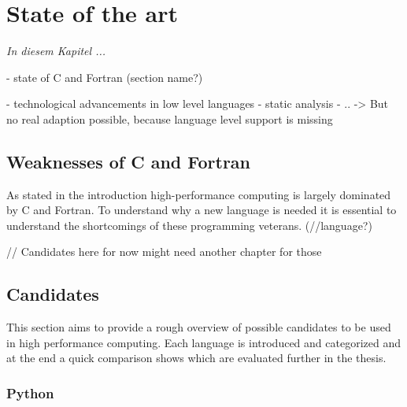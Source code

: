 \chapter{State of the art}
\label{chap:State_of_the_art}

\textit{%
In diesem Kapitel ...
}
\bigskip

- state of C and Fortran (section name?)

- technological advancements in low level languages
    - static analysis
    - ..
    -> But no real adaption possible, because language level support is missing

\section{Weaknesses of C and Fortran} %
\label{sec:Weaknesses_C_Fortran}

As stated in the introduction high-performance computing is largely dominated by C and Fortran. To understand why a new language is needed it is essential to understand the shortcomings of these programming veterans. (//language?)

// Candidates here for now might need another chapter for those
\section{Candidates}
\label{sec:Candidates}

This section aims to provide a rough overview of possible candidates to be used in high performance computing. Each language is introduced and categorized and at the end a quick comparison shows which are evaluated further in the thesis.

\subsection*{Python}
\label{ssec:Candidates.Python}

